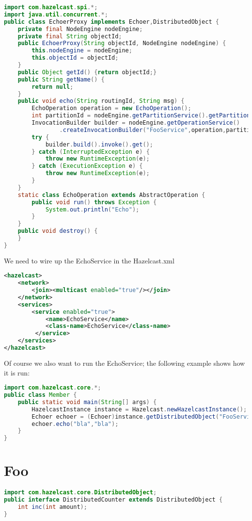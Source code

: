 \begin{lstlisting}[language=java]
import com.hazelcast.spi.*;
import java.util.concurrent.*;
public class EchoerProxy implements Echoer,DistributedObject {
    private final NodeEngine nodeEngine;
    private final String objectId;
    public EchoerProxy(String objectId, NodeEngine nodeEngine) {
        this.nodeEngine = nodeEngine;
        this.objectId = objectId;
    }
    public Object getId() {return objectId;}
    public String getName() {
        return null;
    }
    public void echo(String routingId, String msg) {
        EchoOperation operation = new EchoOperation();
        int partitionId = nodeEngine.getPartitionService().getPartitionId(routingId);
        InvocationBuilder builder = nodeEngine.getOperationService()
                .createInvocationBuilder("FooService",operation,partitionId);
        try {
            builder.build().invoke().get();
        } catch (InterruptedException e) {
            throw new RuntimeException(e);
        } catch (ExecutionException e) {
            throw new RuntimeException(e);
        }
    }
    static class EchoOperation extends AbstractOperation {
        public void run() throws Exception {
            System.out.println("Echo");
        }
    }
    public void destroy() {
    }
}
\end{lstlisting}
We need to wire up the EchoService in the Hazelcast.xml
\begin{lstlisting}[language=xml]
<hazelcast>
    <network>
        <join><multicast enabled="true"/></join>
    </network>
    <services>
        <service enabled="true">
            <name>EchoService</name>
            <class-name>EchoService</class-name>
         </service>
    </services>
</hazelcast>
\end{lstlisting}
Of course we also want to run the EchoService; the following example shows how it is run:
\begin{lstlisting}[language=java]
import com.hazelcast.core.*;
public class Member {
    public static void main(String[] args) {
        HazelcastInstance instance = Hazelcast.newHazelcastInstance();
        Echoer echoer = (Echoer)instance.getDistributedObject("FooService","bla");
        echoer.echo("bla","bla");
    }
}
\end{lstlisting}

\section{Foo}

\begin{lstlisting}[language=java]
import com.hazelcast.core.DistributedObject;
public interface DistributedCounter extends DistributedObject {
    int inc(int amount);
}
\end{lstlisting}

